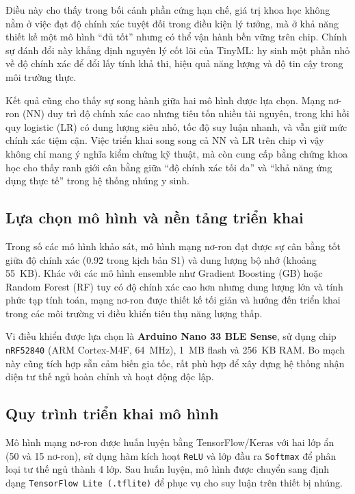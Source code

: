 Điều này cho thấy trong bối cảnh phần cứng hạn chế, giá trị khoa học không nằm ở việc đạt độ chính xác tuyệt đối trong điều kiện lý tưởng, mà ở khả năng thiết kế một mô hình “đủ tốt” nhưng có thể vận hành bền vững trên chip. Chính sự đánh đổi này khẳng định nguyên lý cốt lõi của TinyML: hy sinh một phần nhỏ về độ chính xác để đổi lấy tính khả thi, hiệu quả năng lượng và độ tin cậy trong môi trường thực.  

Kết quả cũng cho thấy sự song hành giữa hai mô hình được lựa chọn. Mạng nơ-ron (NN) duy trì độ chính xác cao nhưng tiêu tốn nhiều tài nguyên, trong khi hồi quy logistic (LR) có dung lượng siêu nhỏ, tốc độ suy luận nhanh, và vẫn giữ mức chính xác tiệm cận. Việc triển khai song song cả NN và LR trên chip vì vậy không chỉ mang ý nghĩa kiểm chứng kỹ thuật, mà còn cung cấp bằng chứng khoa học cho thấy ranh giới cân bằng giữa “độ chính xác tối đa” và “khả năng ứng dụng thực tế” trong hệ thống nhúng y sinh.
\subsection{Lựa chọn mô hình và nền tảng triển khai}

Trong số các mô hình khảo sát, mô hình mạng nơ-ron đạt được sự cân bằng tốt giữa độ chính xác (0.92 trong kịch bản S1) và dung lượng bộ nhớ (khoảng 55~KB). Khác với các mô hình ensemble như Gradient Boosting (GB) hoặc Random Forest (RF) tuy có độ chính xác cao hơn nhưng dung lượng lớn và tính phức tạp tính toán, mạng nơ-ron được thiết kế tối giản và hướng đến triển khai trong các môi trường vi điều khiển tiêu thụ năng lượng thấp.

Vi điều khiển được lựa chọn là \textbf{Arduino Nano 33 BLE Sense}, sử dụng chip \texttt{nRF52840} (ARM Cortex-M4F, 64~MHz), 1~MB flash và 256~KB RAM. Bo mạch này cũng tích hợp sẵn cảm biến gia tốc, rất phù hợp để xây dựng hệ thống nhận diện tư thế ngủ hoàn chỉnh và hoạt động độc lập.

\subsection{Quy trình triển khai mô hình}

Mô hình mạng nơ-ron được huấn luyện bằng TensorFlow/Keras với hai lớp ẩn (50 và 15 nơ-ron), sử dụng hàm kích hoạt \texttt{ReLU} và lớp đầu ra \texttt{Softmax} để phân loại tư thế ngủ thành 4 lớp. Sau huấn luyện, mô hình được chuyển sang định dạng \texttt{TensorFlow Lite (.tflite)} để phục vụ cho suy luận trên thiết bị nhúng.

